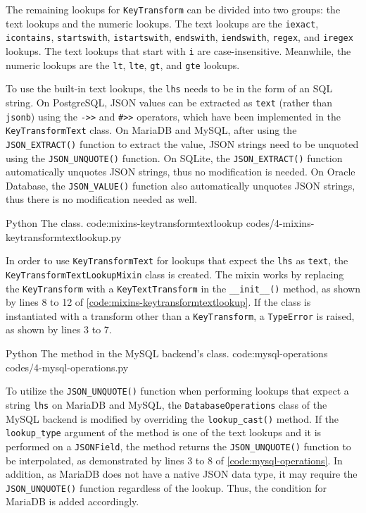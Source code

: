 The remaining lookups for \verb|KeyTransform| can be divided into two groups:
the text lookups and the numeric lookups. The text lookups are the
\verb|iexact|, \verb|icontains|, \verb|startswith|, \verb|istartswith|,
\verb|endswith|, \verb|iendswith|, \verb|regex|, and \verb|iregex| lookups. The
text lookups that start with \verb|i| are case-insensitive. Meanwhile, the
numeric lookups are the \verb|lt|, \verb|lte|, \verb|gt|, and \verb|gte|
lookups.

To use the built-in text lookups, the \verb|lhs| needs to be in the form of an
SQL string. On PostgreSQL, JSON values can be extracted as \verb|text| (rather
than \verb|jsonb|) using the \verb|->>| and \verb|#>>| operators, which have
been implemented in the \verb|KeyTransformText| class. On MariaDB and MySQL,
after using the \verb|JSON_EXTRACT()| function to extract the value, JSON
strings need to be unquoted using the \verb|JSON_UNQUOTE()| function. On
SQLite, the \verb|JSON_EXTRACT()| function automatically unquotes JSON strings,
thus no modification is needed. On Oracle Database, the \verb|JSON_VALUE()|
function also automatically unquotes JSON strings, thus there is no
modification needed as well.

\listing
{Python}
{The  class.}
{code:mixins-keytransformtextlookup}
{codes/4-mixins-keytransformtextlookup.py}

In order to use \verb|KeyTransformText| for lookups that expect the \verb|lhs|
as \verb|text|, the \verb|KeyTransformTextLookupMixin| class is created. The
mixin works by replacing the \verb|KeyTransform| with a \verb|KeyTextTransform|
in the \verb|__init__()| method, as shown by lines 8 to 12 of
\autoref{code:mixins-keytransformtextlookup}. If the class is instantiated with
a transform other than a \verb|KeyTransform|, a \verb|TypeError| is raised, as
shown by lines 3 to 7.

\listing
{Python}
{The  method in the MySQL backend's
 class.}
{code:mysql-operations}
{codes/4-mysql-operations.py}

To utilize the \verb|JSON_UNQUOTE()| function when performing lookups that
expect a string \verb|lhs| on MariaDB and MySQL, the \verb|DatabaseOperations|
class of the MySQL backend is modified by overriding the \verb|lookup_cast()|
method. If the \verb|lookup_type| argument of the method is one of the text
lookups and it is performed on a \verb|JSONField|, the method returns the
\verb|JSON_UNQUOTE()| function to be interpolated, as demonstrated by lines 3
to 8 of \autoref{code:mysql-operations}. In addition, as MariaDB does not have
a native JSON data type, it may require the \verb|JSON_UNQUOTE()| function
regardless of the lookup. Thus, the condition for MariaDB is added accordingly.

